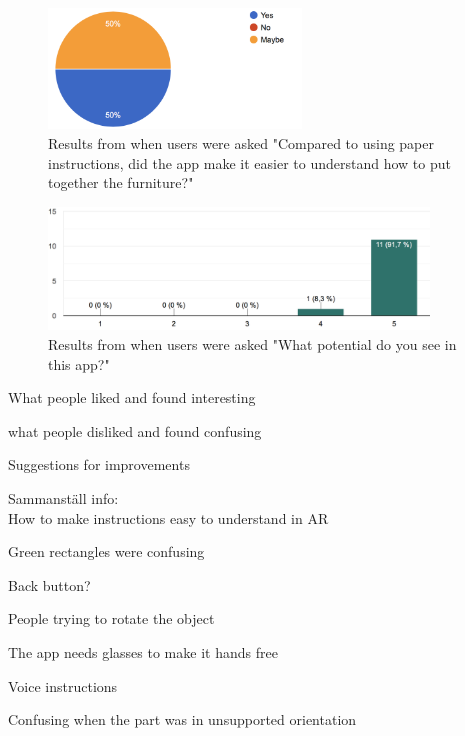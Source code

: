 \begin{figure}[hbtp]
\begin{center}
\includegraphics[width = 0.6\textwidth]{./Images/comparedTo.png}
\caption{Results from when users were asked "Compared to using paper instructions, did the app make it easier to understand how to put together the furniture?"}
\label{fig:question5}
\end{center}
\end{figure}

\begin{figure}[hbtp]
\begin{center}
\includegraphics[width = 0.9\textwidth]{./Images/potential.png}
\caption{Results from when users were asked "What potential do you see in this app?"}
\label{fig:question6}
\end{center}
\end{figure}

What people liked and found interesting


what people disliked and found confusing


Suggestions for improvements



Sammanställ info: \\

How to make instructions easy to understand in AR

Green rectangles were confusing

Back button?

People trying to rotate the object

The app needs glasses to make it hands free

Voice instructions

Confusing when the part was in unsupported orientation








\newpage